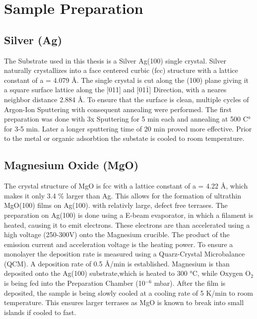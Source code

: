 \section{Sample Preparation}
\subsection{Silver (Ag)}
\noindent The Substrate used in this thesis is a Silver Ag(100) single crystal.  
Silver naturally crystallizes into a face centered curbic (fcc) structure with a lattice constant of a = 4.079 \AA. \cite{PhysRev.25.753}
The single crystal is cut along the (100) plane giving it a square surface lattice along the [011] and [01$\bar{1}$] Direction, with a neares neighbor distance 2.884 \AA.
To ensure that the surface is clean, multiple cycles of Argon-Ion Sputtering with consequent annealing were performed. 
The first preparation was done with 3x Sputtering for 5 min each and annealing at 500 C° for 3-5 min.
Later a longer sputtering time of 20 min proved more effective.  
Prior to the metal or organic adsorbtion the substate is cooled to room temperature.
\subsection{Magnesium Oxide (MgO)}
The crystal structure of MgO is fcc with a lattice constant of a = 4.22 \AA  \cite{guilliatt1969lattice}, which makes it only 3.4 \% larger than Ag.
This allows for the formation of ultrathin MgO(100) films on Ag(100). with relativly large, defect free terrases. 
The preparation on Ag(100) is done using a E-beam evaporator, in which a filament is heated, causing it to emit electrons.
These electrons are than accelerated using a high voltage (250-300V) onto the Magnesium crucible.
The product of the emission current and acceleration voltage is the heating power.
To ensure a monolayer the deposition rate is measured using a Quarz-Crystal Microbalance (QCM).
A deposition rate of 0.5 \AA/min is established.
Magnesium is than deposited onto the Ag(100) substrate,which is heated to 300 °C, while Oxygen O$_2$ is being fed into the Preparation Chamber (10$^{-6}$ mbar).
After the film is deposited, the sample is being slowly cooled at a cooling rate of 5 K/min to room temperature.
This ensures larger terrases as MgO is known to break into small islands if cooled to fast. \cite{pal2014morphology}
\newpage
